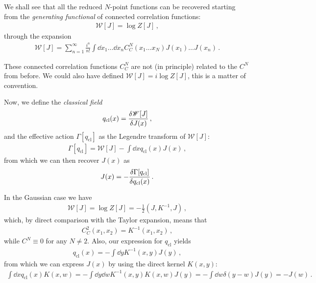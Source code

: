 \documentclass[main.tex]{subfiles}
\begin{document}
We shall see that all the reduced \(N\)-point functions can be recovered starting from the \emph{generating functional} of connected correlation functions:
%
\begin{align}
\mathscr{W}[J] = \log Z[J]
\,,
\end{align}
%
through the expansion 
%
\begin{align}
\mathscr{W}[J] = \sum _{n=1}^{\infty } \frac{i^{n}}{n!} \int \dd{x_1} \dots \dd{x_n} C^{N}_{C} (x_1 \dots x_N) J(x_1) \dots J(x_n)
\,.
\end{align}

These connected correlation functions \(C^{N}_{C}\) are not (in principle) related to the \(C^{N}\) from before. 
We could also have defined \(\mathscr{W}[J] = i \log Z[J]\), this is a matter of convention. 

Now, we define the \emph{classical field}
%
\begin{align}
q _{\text{cl}}(x) = \fdv{\mathscr{W}[J]}{J(x)}
\,,
\end{align}
%
and the effective action \(\Gamma [q _{\text{cl}}]\) as the Legendre transform of \(\mathscr{W}[J]\): 
%
\begin{align}
\Gamma [q _{\text{cl}}] = \mathscr{W}[J] - \int \dd{x} q _{\text{cl}} (x) J(x) 
\,,
\end{align}
%
from which we can then recover \(J(x)\) as 
%
\begin{align}
J(x) = - \fdv{\Gamma [q _{\text{cl}}]}{q _{\text{cl}}(x)}
\,.
\end{align}

In the Gaussian case we have 
%
\begin{align}
\mathscr{W}[J] = \log Z[J] = - \frac{1}{2} (J, K^{-1}, J)  
\,,
\end{align}
%
which, by direct comparison with the Taylor expansion, means that 
%
\begin{align}
C^{2}_{C} (x_1 , x_2 ) = K^{-1} (x_1 , x_2 )
\,,
\end{align}
%
while \(C^{N} \equiv 0\) for any \(N \neq 2\). 
Also, our expression for \(q _{\text{cl}}\) yields 
%
\begin{align}
q _{\text{cl}}(x) = -\int \dd{y} K^{-1}(x, y) J(y) 
\,,
\end{align}
%
from which we can express \(J(x)\) by using the direct kernel \(K(x, y)\): 
%
\begin{align}
\int \dd{x} q _{\text{cl}} (x) K (x, w) = - \int \dd{y} \dd{w} K^{-1}(x, y) K(x, w) J(y) = - \int \dd{w} \delta (y- w) J(y) = - J(w)
\,.
\end{align}
\end{document}
